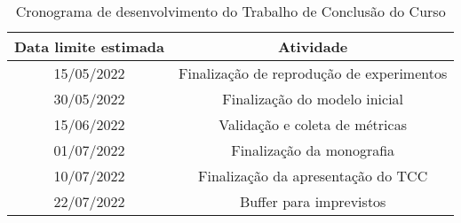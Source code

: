 

\begin{table}[!h]
    \centering
    \begin{tabular}{c|c}
        Data limite estimada & Atividade \\
        \hline
         15/05/2022 & Finalização de reprodução de experimentos\\
         30/05/2022 & Finalização do modelo inicial\\
         15/06/2022 & Validação e coleta de métricas\\
         01/07/2022 & Finalização da monografia\\
         10/07/2022 & Finalização da apresentação do TCC\\
         22/07/2022 & Buffer para imprevistos\\
    \end{tabular}
    \caption{Cronograma de desenvolvimento do Trabalho de Conclusão do Curso}
    \label{tabt3:params}
\end{table} 